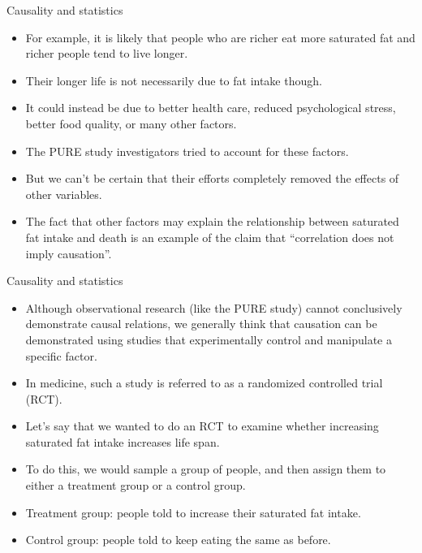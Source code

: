 \documentclass[handout]{beamer}
\begin{document}
\begin{frame}{Causality and statistics}

\scriptsize{
\begin{itemize}
\item For example, it is likely that people who are richer eat more saturated fat and richer people tend to live longer.
\item Their longer life is not necessarily due to fat intake though.
\item It could instead be due to better health care, reduced psychological stress, better food quality, or many other factors. 
\item The PURE study investigators tried to account for these factors.
\item But we can't be certain that their efforts completely removed the effects of other variables. 
\item The fact that other factors may explain the relationship between saturated fat intake and death is an example of the claim  that ``correlation does not imply causation''.
\end{itemize}

}
 
\end{frame}




\begin{frame}{Causality and statistics}

\scriptsize{
\begin{itemize}
\item Although observational research (like the PURE study) cannot conclusively demonstrate causal relations, we generally think that causation can be demonstrated using studies that experimentally control and manipulate a specific factor.

\item In medicine, such a study is referred to as a randomized controlled trial (RCT).
\item Let’s say that we wanted to do an RCT to examine whether increasing saturated fat intake increases life span. 
\item To do this, we would sample a group of people, and then assign them to either a treatment group or a control group.
\item Treatment group: people told to increase their saturated fat intake.
\item  Control group: people told to keep eating the same as before. 
\end{itemize}

}
 
\end{frame}
\end{document}
